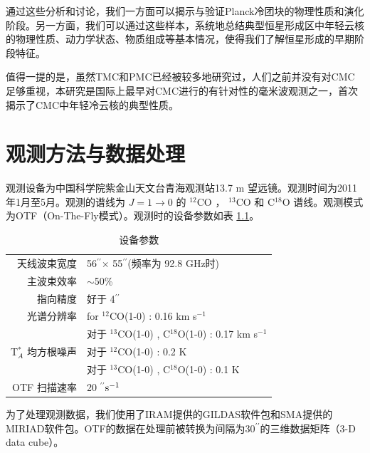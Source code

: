 \documentclass[UTF8, nocolorlinks]{pkuthss}
\newcommand{\coa}{$^{12}$CO }
\newcommand{\cob}{$^{13}$CO }
\newcommand{\coc}{C$^{18}$O }
\newcommand{\coaa}{$^{12}$CO(1-0) }
\newcommand{\cobb}{$^{13}$CO(1-0) }
\newcommand{\cocc}{C$^{18}$O(1-0) }
\newcommand{\kms}{km s$^{-1}$}
\newcommand{\arcsec}{$^{\prime\prime}$}
\begin{document}
		通过这些分析和讨论，我们一方面可以揭示与验证Planck冷团块的物理性质和演化阶段。另一方面，我们可以通过这些样本，系统地总结典型恒星形成区中年轻云核的物理性质、动力学状态、物质组成等基本情况，使得我们了解恒星形成的早期阶段特征。

		值得一提的是，虽然TMC和PMC已经被较多地研究过，人们之前并没有对CMC足够重视，本研究是国际上最早对CMC进行的有针对性的毫米波观测之一，首次揭示了CMC中年轻冷云核的典型性质。

\chapter{观测方法与数据处理}
		
		观测设备为中国科学院紫金山天文台青海观测站13.7 m 望远镜。观测时间为2011年1月至5月。观测的谱线为 $J=1 \rightarrow 0 $ 的  \coa， \cob 和 \coc 谱线。观测模式为OTF（On-The-Fly模式）。观测时的设备参数如表 \ref{Fig.Observation}。

		\begin{table}[H]
        \centering
        \caption{设备参数\label{Fig.Observation}}
        \setlength{\tabcolsep}{0.1in}
        \vspace{0.5em}
        \begin{tabular}{rl}
        \toprule
        \hline
        天线波束宽度 & 56\arcsec$\times$ 55\arcsec (频率为 92.8 GHz时) \\
        主波束效率 & $\sim$50\%                               \\
        指向精度   & 好于 4\arcsec                     \\
        光谱分辨率  & for \coaa: 0.16 \kms                     \\
                             & 对于 \cobb, \cocc:  0.17 \kms           \\
        T$^*_A$ 均方根噪声    & 对于 \coaa: 0.2 K                         \\
                             & 对于 \cobb, \cocc: 0.1 K               \\
        OTF 扫描速率          & 20 \arcsec $\rm s^{-1}$\\
        \hline
        \bottomrule
        \end{tabular}
        \end{table}


        为了处理观测数据，我们使用了IRAM提供的GILDAS软件包\supercite{2000ASPC..217..299G}和SMA提供的MIRIAD软件包\supercite{1995ASPC...77..433S}。OTF的数据在处理前被转换为间隔为30\arcsec 的三维数据矩阵（3-D data cube）。
\end{document}

